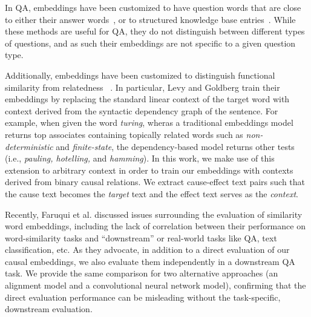 In QA, embeddings have been customized to have question words that are close to either their answer words~\cite{bordes2014question}, or to structured knowledge base entries~\cite{yang2014joint}.  While these methods are useful for QA, they do not distinguish between different types of questions, and as such their embeddings are not specific to a given question type.

Additionally, embeddings have been customized to distinguish functional similarity from relatedness ~\cite{levy2014dependency,kielaspecializing}.
In particular, Levy and Goldberg train their embeddings by replacing the standard linear context of the target word with context derived from the syntactic dependency graph of the sentence.  For example, when given the word \emph{turing}, wheras a traditional embeddings model returns top associates containing topically related words such as \emph{non-deterministic} and \emph{finite-state}, the dependency-based model returns other tests (i.e., \emph{pauling, hotelling,} and \emph{hamming}).
In this work, we make use of this extension to arbitrary context in order to train our embeddings with contexts derived from binary causal relations.  We extract cause-effect text pairs such that the cause text becomes the \emph{target} text and the effect text serves as the \emph{context}. 

Recently, Faruqui et al.\citeyear{faruqui2016problems} discussed issues surrounding the evaluation of similarity word embeddings, including the lack of correlation between their performance on word-similarity tasks and ``downstream'' or real-world tasks like QA, text classification, etc.  As they advocate, in addition to a direct evaluation of our causal embeddings, we also evaluate them independently in a downstream QA task.  We provide the same comparison for two alternative approaches (an alignment model and a convolutional neural network model), confirming that the direct evaluation performance can be misleading without the task-specific, downstream evaluation. 



